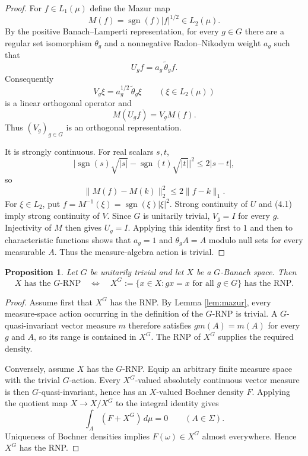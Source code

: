 \documentclass[11pt]{article}
\newtheorem{proposition}[theorem]{Proposition}
\theoremstyle{remark}
\begin{document}
\begin{proof}
For $f\in L_1(\mu)$ define the Mazur map
\[
 M(f)=\operatorname{sgn}(f)|f|^{1/2}\in L_2(\mu).
\]
By the positive Banach--Lamperti representation, for every $g\in G$ there
are a regular set isomorphism $\theta_g$ and a nonnegative Radon--Nikodym
weight $a_g$ such that
\[
 U_gf=a_g\,\widetilde\theta_gf.
\]
Consequently
\[
 V_g\xi=a_g^{1/2}\,\widetilde\theta_g\xi
 \qquad(\xi\in L_2(\mu))
\]
is a linear orthogonal operator and
\begin{equation*}
 M(U_gf)=V_gM(f).
 \tag{4.1}
\end{equation*}
Thus $(V_g)_{g\in G}$ is an orthogonal representation.

It is strongly continuous.  For real scalars $s,t$,
\[
 \bigl|\operatorname{sgn}(s)\sqrt{|s|}
       -\operatorname{sgn}(t)\sqrt{|t|}\bigr|^2
 \leq 2|s-t|,
\]
so
\[
 \|M(f)-M(k)\|_2^2\leq2\|f-k\|_1.
\]
For $\xi\in L_2$, put
$f=M^{-1}(\xi)=\operatorname{sgn}(\xi)|\xi|^2$.  Strong continuity of $U$
and (4.1) imply strong continuity of $V$.  Since $G$ is unitarily trivial,
$V_g=I$ for every $g$.  Injectivity of $M$ then gives $U_g=I$.
Applying this identity first to $1$ and then to characteristic functions
shows that $a_g=1$ and $\theta_gA=A$ modulo null sets for every measurable
$A$.  Thus the measure-algebra action is trivial.
\end{proof}

\begin{proposition}\label{prop:fixed}
Let $G$ be unitarily trivial and let $X$ be a $G$-Banach space.  Then
\[
 X\text{ has the }G\text{-RNP}
 \quad\Longleftrightarrow\quad
 X^G:=\{x\in X:gx=x\text{ for all }g\in G\}\text{ has the RNP}.
\]
\end{proposition}

\begin{proof}
Assume first that $X^G$ has the RNP.  By Lemma \ref{lem:mazur}, every
measure-space action occurring in the definition of the $G$-RNP is trivial.
A $G$-quasi-invariant vector measure $m$ therefore satisfies
$gm(A)=m(A)$ for every $g$ and $A$, so its range is contained in $X^G$.
The RNP of $X^G$ supplies the required density.

Conversely, assume $X$ has the $G$-RNP.  Equip an arbitrary finite measure
space with the trivial $G$-action.  Every $X^G$-valued absolutely continuous
vector measure is then $G$-quasi-invariant, hence has an $X$-valued Bochner
density $F$.  Applying the quotient map $X\to X/X^G$ to the integral
identity gives
\[
 \int_A(F+X^G)\,d\mu=0
 \qquad(A\in\Sigma).
\]
Uniqueness of Bochner densities implies $F(\omega)\in X^G$ almost
everywhere.  Hence $X^G$ has the RNP.
\end{proof}
\end{document}
